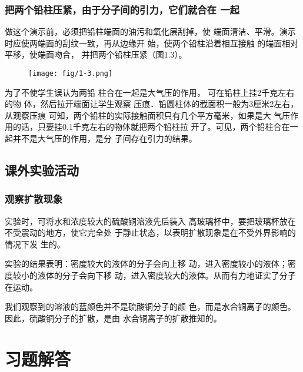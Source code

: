 \subsubsection{把两个铅柱压紧，由于分子间的引力，它们就合在
一起}

做这个演示前，必须把铅柱端面的油污和氧化层刮掉，使
端面清洁、平滑。演示时应使两端面的刮纹一致，再从边缘开
始，使两个铅柱沿着相互接触
的端面相对平移，使端面吻合，
并把两个铅柱压紧（图1.3）。
\begin{figure}[htp]\centering
    \centering
    \texttt{[image: fig/1-3.png]}
    \caption{}
    \end{figure}

为了不使学生误认为两铅
柱合在一起是大气压的作用，
可在铅柱上挂2千克左右的物
体，然后拉开端面让学生观察
压痕．铅圆柱体的截面积一般为3厘米2左右，从观察压痕
可知，两个铅柱的实际接触面积只有几个平方毫米，如果是大
气压作用的话，只要挂0.1千克左右的物体就把两个铅柱拉
开了。可见，两个铅柱合在一起并不是大气压的作用，是分
子间存在引力的结果。

\subsection{课外实验活动}
\subsubsection{观察扩散现象}

实验时，可将水和浓度较大的硫酸铜溶液先后装入
高玻璃杯中，要把玻璃杯放在不受震动的地方，使它完全处
于静止状态，以表明扩散现象是在不受外界影响的情况下发
生的。

实验的结果表明：密度较大的液体的分子会向上移
动，进入密度较小的液体；密度较小的液体的分子会向下移
动，进入密度较大的液体。从而有力地证实了分子在运动。

我们观察到的溶液的蓝颜色并不是硫酸铜分子的颜
色，而是水合铜离子的颜色。因此，硫酸铜分子的扩散，是由
水合铜离子的扩散推知的。

\section{习题解答}
